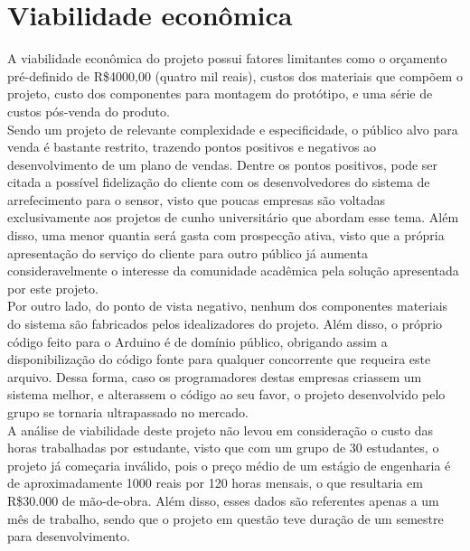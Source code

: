 
\section{Viabilidade econômica}
A viabilidade econômica do projeto possui fatores limitantes como o orçamento pré-definido de R\$4000,00 (quatro mil reais), custos dos materiais que compõem o projeto, custo dos componentes para montagem do protótipo, e uma série de custos pós-venda do produto. \\

Sendo um projeto de relevante complexidade e especificidade, o público alvo para venda é bastante restrito, trazendo pontos positivos e negativos ao desenvolvimento de um plano de vendas. Dentre os pontos positivos, pode ser citada a possível fidelização do cliente com os desenvolvedores do sistema de arrefecimento para o sensor, visto que poucas empresas são voltadas exclusivamente aos projetos de cunho universitário que abordam esse tema. Além disso, uma menor quantia será gasta com prospecção ativa, visto que a própria apresentação do serviço do cliente para outro público já aumenta consideravelmente o interesse da comunidade acadêmica pela solução apresentada por este projeto. \\

Por outro lado, do ponto de vista negativo, nenhum dos componentes materiais do sistema são fabricados pelos idealizadores do projeto. Além disso, o próprio código feito para o Arduino é de domínio público, obrigando assim a disponibilização do código fonte para qualquer concorrente que requeira este arquivo. Dessa forma, caso os programadores destas empresas criassem um sistema melhor, e alterassem o código ao seu favor, o projeto desenvolvido pelo grupo se tornaria ultrapassado no mercado.\\ 

A análise de viabilidade deste projeto não levou em consideração o custo das horas trabalhadas por estudante, visto que com um grupo de 30 estudantes, o projeto já começaria inválido, pois o preço médio de um estágio de engenharia é de aproximadamente 1000 reais por 120 horas mensais, o que resultaria em R\$30.000 de mão-de-obra. Além disso, esses dados são referentes apenas a um mês de trabalho, sendo que o projeto em questão teve duração de um semestre para desenvolvimento. \\


